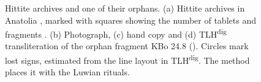 \newcommand{\hb}[1]{{\fontspec{Noto Sans Display}#1}}   %
\newcommand{\hit}[1]{\textit{#1}}                         %
\begin{figure}[!t]
  \centering
  
  \caption{Hittite archives and one of their orphans. (a) Hittite archives in Anatolia
    \citep[after][]{cammarosano2017map}, marked with squares showing the number of tablets and fragments
    \citep{hoffner2024grammar,rieken2019kayalipinar}. (b) Photograph, (c) hand copy and (d)
    TLH\textsuperscript{dig} transliteration of the orphan fragment KBo 24.8 (). Circles
    mark lost signs, estimated from the line layout in TLH\textsuperscript{dig}. The method places
    it with the Luwian rituals.}
  \label{fig:fragment}
\end{figure}
